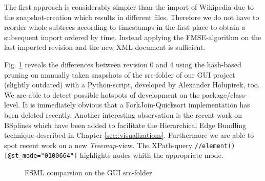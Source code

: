 The first approach is considerably simpler than the import of Wikipedia due to the snapshot-creation which results in different files. Therefore we do not have to reorder whole subtrees according to timestamps in the first place to obtain a subsequent import ordered by time. Instead applying the FMSE-algorithm on the last imported revision and the new XML document is sufficient.

Fig. \ref{fig:fsml-gui} reveals the differences between revision 0 and 4 using the hash-based pruning on manually taken snapshots of the src-folder of our GUI project (slightly outdated) with a Python-script, developed by Alexander Holupirek, too. We are able to detect possible hotspots of development on the package/class-level. It is immediately obvious that a ForkJoin-Quicksort implementation has been deleted recently. Another interesting observation is the recent work on BSplines which have been added to facilitate the Hierarchical Edge Bundling technique described in Chapter \ref{sec::visualizations}. Furthermore we are able to spot recent work on a new \emph{Treemap}-view. The XPath-query \texttt{//element()[@st\_mode="0100664"]} highlights nodes whith the appropriate mode.

\begin{figure}[tb]
\caption{\label{fig:fsml-gui} FSML comparsion on the GUI src-folder}
\end{figure}

